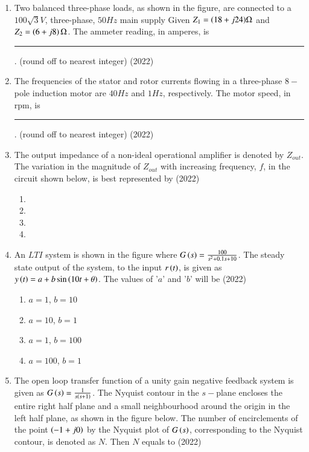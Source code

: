 \documentclass[journal]{IEEEtran}
\begin{document}
\begin{enumerate}
\item Two balanced three-phase loads, as shown in the figure, are connected to a $100\sqrt{3}V$, three-phase, $50Hz$ main supply Given $Z_{1}=(18+j24)\ohm$ and $Z_{2}=\left(6+j8\right)\ohm$. The ammeter reading, in amperes, is \rule{1cm}{0.15mm}. (round off to nearest integer) \hfill(2022)




\item The frequencies of the stator and rotor currents flowing in a three-phase $8-$pole induction motor are $40Hz$ and $1Hz$, respectively. The motor speed, in rpm, is \rule{1cm}{0.15mm}. (round off to nearest integer) \hfill(2022)


\item The output impedance of a non-ideal operational amplifier is denoted by $Z_{out}$. The variation in the magnitude of $Z_{out}$ with increasing frequency, $f$, in the circuit shown below, is best represented by \hfill(2022)


\begin{multicols}{2}
\begin{enumerate}
\item 
\item 
\item 
\item 
\end{enumerate}
\end{multicols}


\item An $LTI$ system is shown in the figure where $G\left(s\right)=\frac{100}{s^{2}+0.1s+10}$. The steady state output of the system, to the input $r\left(t\right)$, is given as $y\left(t\right)=a+b\sin{\ensuremath{\left(10t+\theta\right)}}$. The values of '$a$' and '$b$' will be \hfill(2022)


\begin{multicols}{2}
\begin{enumerate}
\item $a=1$, $b=10$
\item $a=10$, $b=1$
\item $a=1$, $b=100$
\item $a=100$, $b=1$
\end{enumerate}
\end{multicols}


\item The open loop transfer function of a unity gain negative feedback system is given as $G\left(s\right)=\frac{1}{s\left(s+1\right)}$. The Nyquist contour in the $s-$plane encloses the entire right half plane and a small neighbourhood around the origin in the left half plane, as shown in the figure below. The number of encirclements of the point $\left(-1+j0\right)$ by the Nyquist plot of $G\left(s\right)$, corresponding to the Nyquist contour, is denoted as $N$. Then $N$ equals to \hfill(2022)


\end{enumerate}
\end{document}
